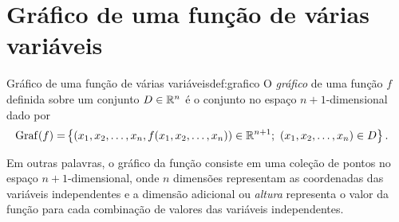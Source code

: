 \section{Gráfico de uma função de várias variáveis}


\begin{definition}{Gráfico de uma função de várias variáveis}{def:grafico}
O \textit{gráfico} de uma função $f$ definida sobre um conjunto $D\in\mathbb{R}^n$ é o conjunto no espaço \(n+1\)-dimensional dado por 
\begin{align*}
\operatorname{Graf}(f)
=&\left\{(x_1, x_2, \ldots, x_n, f(x_1, x_2, \ldots, x_n))\in\mathbb{R}^{n+1};~(x_1, x_2, \ldots, x_n)\in D \right\}.
\end{align*}

\end{definition}

Em outras palavras, o gráfico da função consiste em uma coleção de pontos no espaço \(n+1\)-dimensional, onde \(n\) dimensões representam as coordenadas das variáveis independentes e a dimensão adicional ou \textit{altura} representa o valor da função para cada combinação de valores das variáveis independentes.


